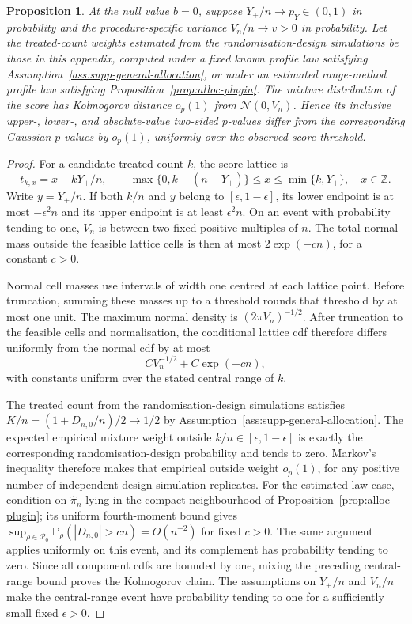 \documentclass[12pt,a4paper]{article}
\newtheorem{proposition}{Proposition}
\theoremstyle{definition}
\theoremstyle{remark}\newtheorem{remark}{Remark}
\numberwithin{equation}{section}
\newcommand{\Pbb}{\mathbb P}
\newcommand{\Z}{\mathbb Z}
\begin{document}
\begin{proposition}\label{prop:lnm}
At the null value $b=0$, suppose $Y_+/n\to p_Y\in(0,1)$ in probability and the procedure-specific variance $V_n/n\to v>0$ in probability. Let the treated-count weights estimated from the randomisation-design simulations be those in this appendix, computed under a fixed known profile law satisfying Assumption~\ref{ass:supp-general-allocation}, or under an estimated range-method profile law satisfying Proposition~\ref{prop:alloc-plugin}. The mixture distribution of the score has Kolmogorov distance $o_p(1)$ from $\mathcal N(0,V_n)$. Hence its inclusive upper-, lower-, and absolute-value two-sided $p$-values differ from the corresponding Gaussian $p$-values by $o_p(1)$, uniformly over the observed score threshold.
\end{proposition}
\begin{proof}
For a candidate treated count $k$, the score lattice is
\[
 t_{k,x}=x-kY_+/n,\qquad
 \max\{0,k-(n-Y_+)\}\le x\le\min\{k,Y_+\},\quad x\in\Z.
\]
Write $y=Y_+/n$. If both $k/n$ and $y$ belong to $[\epsilon,1-\epsilon]$, its lower endpoint is at most $-\epsilon^2n$ and its upper endpoint is at least $\epsilon^2n$. On an event with probability tending to one, $V_n$ is between two fixed positive multiples of $n$. The total normal mass outside the feasible lattice cells is then at most $2\exp(-c n)$, for a constant $c>0$.

Normal cell masses use intervals of width one centred at each lattice point. Before truncation, summing these masses up to a threshold rounds that threshold by at most one unit. The maximum normal density is $(2\pi V_n)^{-1/2}$. After truncation to the feasible cells and normalisation, the conditional lattice cdf therefore differs uniformly from the normal cdf by at most
\[
 C V_n^{-1/2}+C\exp(-cn),
\]
with constants uniform over the stated central range of $k$.

The treated count from the randomisation-design simulations satisfies $K/n=(1+D_{n,0}/n)/2\to1/2$ by Assumption~\ref{ass:supp-general-allocation}. The expected empirical mixture weight outside $k/n\in[\epsilon,1-\epsilon]$ is exactly the corresponding randomisation-design probability and tends to zero. Markov's inequality therefore makes that empirical outside weight $o_p(1)$, for any positive number of independent design-simulation replicates. For the estimated-law case, condition on $\widehat\pi_n$ lying in the compact neighbourhood of Proposition~\ref{prop:alloc-plugin}; its uniform fourth-moment bound gives $\sup_{\rho\in\mathcal P_0}\Pbb_\rho(|D_{n,0}|>c n)=O(n^{-2})$ for fixed $c>0$. The same argument applies uniformly on this event, and its complement has probability tending to zero. Since all component cdfs are bounded by one, mixing the preceding central-range bound proves the Kolmogorov claim. The assumptions on $Y_+/n$ and $V_n/n$ make the central-range event have probability tending to one for a sufficiently small fixed $\epsilon>0$.


\end{proof}
\end{document}
